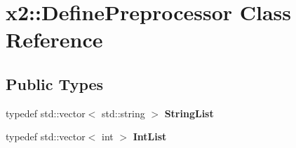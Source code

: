 \hypertarget{classx2_1_1_define_preprocessor}{}\section{x2\+:\+:Define\+Preprocessor Class Reference}
\label{classx2_1_1_define_preprocessor}
\subsection*{Public Types}
\begin{DoxyCompactItemize}
\item 
\mbox{\label{classx2_1_1_define_preprocessor_aeaf9f5de751a2ba570d7e5809a57bf3c}} 
typedef std\+::vector$<$ std\+::string $>$ {\bfseries String\+List}
\item 
\mbox{\label{classx2_1_1_define_preprocessor_a15476c94a3988295d4207943d2984783}} 
typedef std\+::vector$<$ int $>$ {\bfseries Int\+List}
\end{DoxyCompactItemize}
